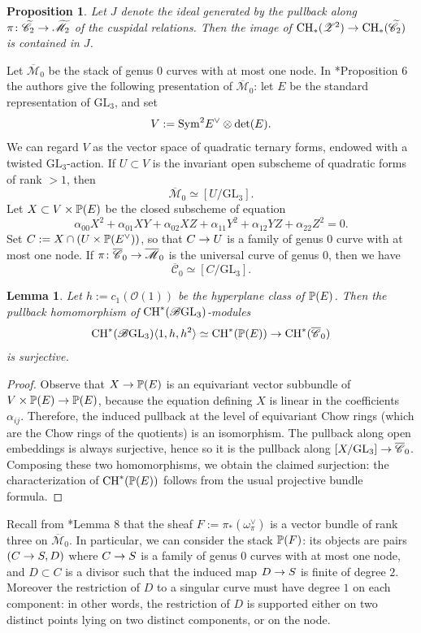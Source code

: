 \documentclass[a4paper, 10pt]{amsart}
\numberwithin{equation}{section}
\numberwithin{subsection}{section}
\newtheorem{proposition}[theorem]{Proposition}
\newtheorem{lemma}[theorem]{Lemma}
\theoremstyle{definition}
\theoremstyle{remark}
\renewcommand{\mathcal}{\mathscr}
\newcommand\cC{\mathcal{C}} \newcommand\cD{\mathcal{D}}
\newcommand\cM{\mathcal{M}} \newcommand\cN{\mathcal{N}}
\newcommand\cO{\mathcal{O}} \newcommand\cP{\mathcal{P}}
\newcommand\arr{\ifinner\to\else\longrightarrow\fi}
\newcommand{\GL}{\mathrm{GL}}
\newcommand{\Mbar}{\overline{\cM}}
\newcommand{\Mtilde}{\widetilde{\mathcal M}}
\newcommand{\Cbar}{\overline{\cC}}
\newcommand{\Ctilde}{\widetilde{\mathcal C}}
\newcommand{\ch}[1][*]{\operatorname{CH}^{#1}}
\begin{document}
	\begin{proposition}\label{prop:relations two cusps}
		Let $J$ denote the ideal generated by the pullback along $\pi\colon\Ctilde_2\arr\Mtilde_2$ of the cuspidal relations. Then the image of 
		${\rm CH}_*(\cZ^2) \arr {\rm CH}_*(\Ctilde_2)$ is contained in $J$.
	\end{proposition}
	Let $\Mbar_0$ be the stack of genus $0$ curves with at most one node. In \cite{EFRat}*{Proposition 6} the authors give the following presentation of $\Mbar_0$: let $E$ be the standard representation of $\GL_3$, and set
	\[ V:={\rm Sym}^2E^{\vee}\otimes\det(E). \]
	We can regard $V$ as the vector space of quadratic ternary forms, endowed with a twisted $\GL_3$-action. If $U\subset V$ is the invariant open subscheme of quadratic forms of rank $>1$, then
	\[ \Mbar_0 \simeq [U/\GL_3]. \]
	Let $X\subset V\times \mathbb{P}(E)$ be the closed subscheme of equation
	\[ \alpha_{00}X^2 + \alpha_{01} XY + \alpha_{02} XZ + \alpha_{11} Y^2 + \alpha_{12} YZ + \alpha_{22} Z^2 = 0 .  \]
	Set $C:= X\cap (U\times\mathbb{P}(E^{\vee}))$, so that $C\arr U$ is a family of genus $0$ curve with at most one node.
	If $\pi\colon\Cbar_0\arr \Mbar_0$ is the universal curve of genus $0$, then we have
	\[ \Cbar_0 \simeq [C/\GL_3]. \]
	\begin{lemma}\label{lm:chow Cbar0}
		Let $h:=c_1(\cO(1))$ be the hyperplane class of $\mathbb{P}(E)$. Then the pullback homomorphism of $\ch(\cB\GL_3)$-modules
		\[ \ch(\cB \GL_3)\langle 1, h, h^2\rangle \simeq \ch(\PP(E)) \arr \ch(\Cbar_0) \]
		is surjective.
	\end{lemma}
	\begin{proof}
		Observe that $X \arr \PP(E)$ is an equivariant vector subbundle of $V\times\PP(E) \arr \PP(E)$, because the equation defining $X$ is linear in the coefficients $\alpha_{ij}$. Therefore, the induced pullback at the level of equivariant Chow rings (which are the Chow rings of the quotients) is an isomorphism.
		The pullback along open embeddings is always surjective, hence so it is the pullback along $[X/\GL_3]\arr \Cbar_0$. Composing these two homomorphisms, we obtain the claimed surjection: the characterization of $\ch(\PP(E))$ follows from the usual projective bundle formula.
	\end{proof}
	Recall from \cite{EFRat}*{Lemma 8} that the sheaf $F:=\pi_*(\omega_{\pi}^{\vee})$ is a vector bundle of rank three on $\Mbar_0$. In particular, we can consider the stack $\mathbb{P}(F)$: its objects are pairs $(C\arr S, D)$ where $C\arr S$ is a family of genus $0$ curves with at most one node, and $D\subset C$ is a divisor such that the induced map $D\arr S$ is finite of degree $2$. Moreover the restriction of $D$ to a singular curve must have degree $1$ on each component: in other words, the restriction of $D$ is supported either on two distinct points lying on two distinct components, or on the node.
	
\end{document}
